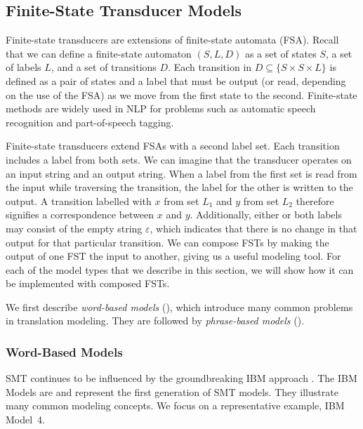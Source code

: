 \subsection{Finite-State Transducer Models}\label{sec:finite-state-models}

Finite-state transducers are extensions
of finite-state automata (FSA).  Recall that
we can define a finite-state automaton $(S,L,D)$ as a set of states $S$,
a set of labels $L$, and a set of transitions $D$. Each transition in 
$D \subseteq \{S \times S \times L\}$ 
is defined as a pair of states and a label that must be
output (or read, depending on the use of the FSA)
as we move from the first state to the second.
Finite-state methods are widely used in NLP for problems
such as automatic speech recognition and part-of-speech tagging.

Finite-state transducers extend  FSAs 
with a second label set.  Each transition includes a label
from both sets.  We can imagine that the transducer operates
on an input string and an output string.  When a label from the 
first set is read from the input while traversing the transition, the label for the 
other is written to the output.  A transition labelled with $x$ from set
$L_1$ and $y$ from set $L_2$ therefore signifies a correspondence
between $x$ and $y$.  Additionally, either or both labels may
consist of the empty string $\varepsilon$, which indicates that
there is no change in that output for that particular transition.
We can compose FSTs by making the output of one FST the input to
another, giving us a useful modeling tool.  For each of the model
types that we describe in this section, we will show how it can
be implemented with composed FSTs.

We first describe {\em word-based models} (), which introduce
many common problems in translation modeling.  They are
followed by {\em phrase-based
models} ().

\subsubsection{Word-Based Models}\label{sec:word-based-models}

SMT continues to be influenced by the groundbreaking
IBM approach \citep{Brown:1990:cl,Brown:1993:cl,Berger:1994:hlt}.
The IBM Models are  and 
represent the first generation of SMT models.
They illustrate many common modeling concepts.
We focus on a representative example, IBM Model~4.

